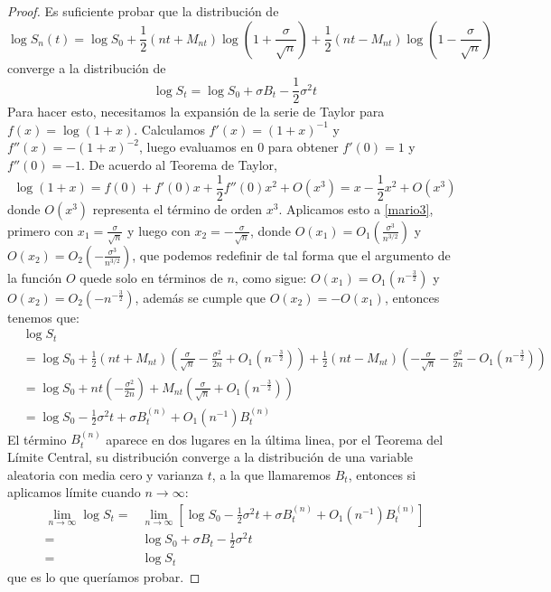 \documentclass[11pt,notitlepage]{article}
\begin{document}
\begin{proof}
 Es suficiente probar que la distribución de
 \[\log S_n(t) = \log S_0 + \frac{1}{2}(nt + M_{nt}) \log\left(1 + \frac{\sigma}{\sqrt{n}}\right) + \frac{1}{2}(nt - M_{nt}) \log\left(1 - \frac{\sigma}{\sqrt{n}}\right) \]
 converge a la distribución de
 \[\log S_t = \log S_0 + \sigma B_t - \frac{1}{2}\sigma^2t\]
 Para hacer esto, necesitamos la expansión de la serie de Taylor para $f(x) = \log (1+ x)$. Calculamos $f'(x)=(1+x)^{-1}$ y $f''(x) = - (1+ x) ^{-2}$, luego evaluamos en $0$ para obtener $f'(0) = 1$ y $f''(0) = -1$. De acuerdo al Teorema de Taylor,
 \[\log (1+x) = f(0) + f'(0)x + \frac{1}{2}f''(0)x^2 + O(x^3) = x - \frac{1}{2}x^2 + O(x^3)\]
 donde $O(x^3)$ representa el término de orden $x^3$. Aplicamos esto a \eqref{mario3}, primero con $x_1= \frac{\sigma}{\sqrt{n}}$ y luego con $x_2 = -\frac{\sigma}{\sqrt{n}}$, donde $O(x_1) = O_1(\frac{\sigma^3}{n^{3/2}})$ y $O(x_2) = O_2(-\frac{\sigma^3}{n^{3/2}})$, que podemos redefinir de tal forma que el argumento de la función $O$ quede solo en términos de $n$, como sigue: $O(x_1) = O_1(n^{-\frac{3}{2}}) $ y $O(x_2) = O_2(-n^{-\frac{3}{2}}) $, además se cumple que $O(x_2) = - O(x_1)$, entonces tenemos que:
 \begin{align*}
     &\log S_t \\
     & =  \log S_0 + \frac{1}{2}(nt + M_{nt}) \left( \frac{\sigma}{\sqrt{n}} - \frac{\sigma^2}{2n} + O_1(n^{-\frac{3}{2}})\right) + \frac{1}{2}(nt - M_{nt}) \left( -\frac{\sigma}{\sqrt{n}} - \frac{\sigma^2}{2n} - O_1(n^{-\frac{3}{2}})\right)\\
     &= \log S_0 + nt \left(- \frac{\sigma^2}{2n}\right) + M_{nt} \left( \frac{\sigma}{\sqrt{n}}  + O_1(n^{-\frac{3}{2}})\right)\\
     &=\log S_0  - \frac{1}{2}\sigma^2t + \sigma B^{(n)}_t + O_1(n^{-1})B^{(n)}_t
 \end{align*}
 El término $B^{(n)}_t$ aparece en dos lugares en la última linea, por el Teorema del Límite Central, su distribución converge a la distribución de una variable aleatoria con media cero y varianza $t$, a la que llamaremos $B_t$, entonces si aplicamos límite cuando $n \rightarrow \infty$:
 \begin{align*}
    \lim_{n \rightarrow \infty} \log S_t = & \lim_{n \rightarrow \infty} \left[\log S_0  - \frac{1}{2}\sigma^2t + \sigma B^{(n)}_t + O_1(n^{-1})B^{(n)}_t\right]\\
    = & \log S_0 + \sigma B_t - \frac{1}{2}\sigma^2t\\
     = &\log S_t
 \end{align*}
 que es lo que queríamos probar.
\end{proof}
\end{document}
